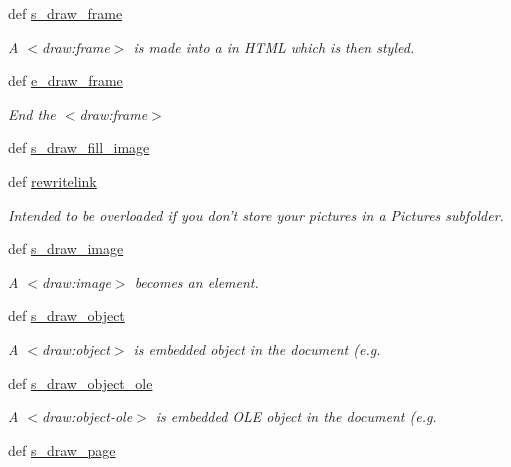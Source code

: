 \begin{DoxyCompactItemize}
def \hyperlink{classodf_1_1odf2xhtml_1_1ODF2XHTML_a8817e1084f5834a6c2404a9b0cd2b310}{s\+\_\+draw\+\_\+frame}
\begin{DoxyCompactList}\small\item\em A $<$draw\+:frame$>$ is made into a  in H\+T\+M\+L which is then styled. \end{DoxyCompactList}\item 
def \hyperlink{classodf_1_1odf2xhtml_1_1ODF2XHTML_a43856079ee04e091b6b3f5d4bd8ade34}{e\+\_\+draw\+\_\+frame}
\begin{DoxyCompactList}\small\item\em End the $<$draw\+:frame$>$ \end{DoxyCompactList}\item 
def \hyperlink{classodf_1_1odf2xhtml_1_1ODF2XHTML_a197a08b0c02aeafe12761554a91500bb}{s\+\_\+draw\+\_\+fill\+\_\+image}
\item 
def \hyperlink{classodf_1_1odf2xhtml_1_1ODF2XHTML_a4b3b1cb31b1314eb5f311f9743f7402e}{rewritelink}
\begin{DoxyCompactList}\small\item\em Intended to be overloaded if you don't store your pictures in a Pictures subfolder. \end{DoxyCompactList}\item 
def \hyperlink{classodf_1_1odf2xhtml_1_1ODF2XHTML_afab81358931922b2cf7a9cfd5554968d}{s\+\_\+draw\+\_\+image}
\begin{DoxyCompactList}\small\item\em A $<$draw\+:image$>$ becomes an  element. \end{DoxyCompactList}\item 
def \hyperlink{classodf_1_1odf2xhtml_1_1ODF2XHTML_a79b6f2c8b28e69acaa106f0c577f070f}{s\+\_\+draw\+\_\+object}
\begin{DoxyCompactList}\small\item\em A $<$draw\+:object$>$ is embedded object in the document (e.\+g. \end{DoxyCompactList}\item 
def \hyperlink{classodf_1_1odf2xhtml_1_1ODF2XHTML_a35f1faec7eef6b156647fd4bedc9f867}{s\+\_\+draw\+\_\+object\+\_\+ole}
\begin{DoxyCompactList}\small\item\em A $<$draw\+:object-\/ole$>$ is embedded O\+L\+E object in the document (e.\+g. \end{DoxyCompactList}\item 
def \hyperlink{classodf_1_1odf2xhtml_1_1ODF2XHTML_a21d717ff541974323a57d08f1ea7bf52}{s\+\_\+draw\+\_\+page}

\end{DoxyCompactItemize}
